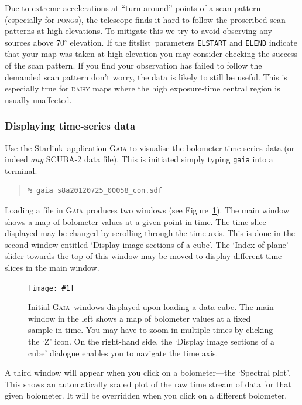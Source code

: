 \documentclass[twoside,11pt]{article}
\newcommand{\htmladdnormallink}[2]{#1}
\newcommand{\htmladdimg}[1]{}
\newcommand{\htmlref}[2]{#1}
\newcommand{\latexhtml}[2]{#1}
\newcommand{\xref}[3]{#1}
\newcommand{\xlabel}[1]{}
\renewcommand{\_}{\texttt{\symbol{95}}}
\newenvironment{myquote}{\begin{quote}\begin{small}}{\end{small}\end{quote}}
\newcommand{\starlink}{\htmladdnormallink{Starlink}{http://starlink.jach.hawaii.edu}}
\newcommand{\gaia}{\xref{\textsc{Gaia}}{sun214}{}}
\newcommand{\task}[1]{\textsf{#1}}
\newcommand{\param}[1]{\texttt{#1}}
\newcommand{\fitslist}{\xref{\task{fitslist}}{sun95}{FITSLIST}}
\newcommand{\myfig}[6]{
  \begin{figure}#2
    \centering\texttt{[image: \#1]}
    \typeout{#1 inserted on page \arabic{page}}
    \caption[#5]{\label{#4}\small #6}
  \end{figure}
}
\newcommand{\myfig}[6]{
    \label{#4} \htmladdimg{#1.png}\\
    \\
    Figure: #6\\
  }
\newcommand{\cref}[3]{\latexhtml{#1~\ref{#2}}{\htmlref{#3}{#2}}}
\begin{document}
Due to extreme accelerations at ``turn-around'' points of a scan
pattern (especially for \textsc{pong}s), the telescope finds it hard
to follow the proscribed scan patterns at high elevations. To mitigate
this we try to avoid observing any sources above 70$^\circ$ elevation.
If the \fitslist\ parameters \param{ELSTART} and \param{ELEND}
indicate that your map was taken at high elevation you may consider
checking the success of the scan pattern. If you find your observation
has failed to follow the demanded scan pattern don't worry, the data is
likely to still be useful. This is especially true for \textsc{daisy}
maps where the high exposure-time central region is usually
unaffected.

\subsubsection{\xlabel{display_cube}Displaying time-series data}
\label{sec:gaiacube}

Use the \starlink\ application \textsc{Gaia} to visualise the bolometer
time-series data (or indeed \emph{any} SCUBA-2 data file). This is
initiated simply typing \texttt{gaia} into a terminal.

\begin{myquote}
\begin{verbatim}
% gaia s8a20120725_00058_con.sdf
\end{verbatim}
\end{myquote}

Loading a file in \textsc{Gaia} produces two windows (see
\cref{Figure}{fig:gaia_main}{upper graphic}). The main window shows a map of bolometer
values at a given point in time. The time slice displayed may be
changed by scrolling through the time axis. This is done in the second
window entitled `Display image sections of a cube'. The `Index of
plane' slider towards the top of this window may be moved to display
different time slices in the main window.

\myfig{sc21_gaia1}{[b]}{width=\linewidth}{fig:gaia_main}{
  Raw data displayed in the main \gaia\ window}{
  Initial \gaia\ windows displayed upon loading a data cube.
  The main window in the left shows a map of bolometer values at a fixed
  sample in time. You may have to zoom in multiple times by clicking the
  `Z' icon. On the right-hand side, the `Display image sections of a cube'
  dialogue enables you to navigate the time axis.}

A third window will appear when you click on a bolometer---the
`Spectral plot'. This shows an automatically scaled plot of the raw
time stream of data for that given bolometer. It will be overridden
when you click on a different bolometer.
\end{document}
